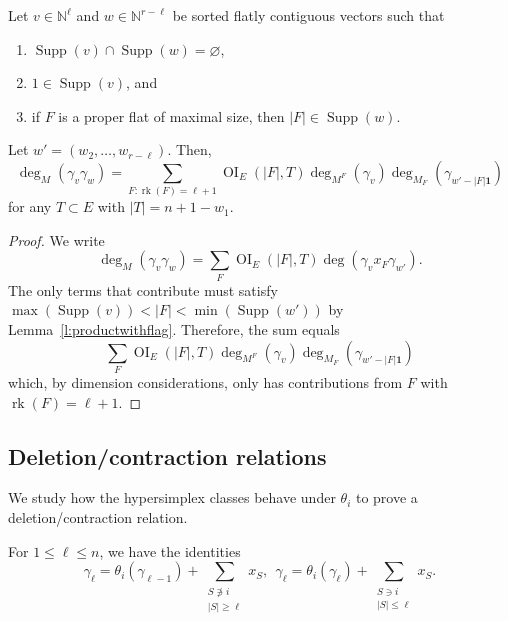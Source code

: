 \documentclass[ALCO,published]{cedram}
\numberwithin{equation}{section}
\numberwithin{figure}{section}
\newcommand{\N}{\mathbb{N}}
\DeclareMathOperator{\OI}{OI}
\DeclareMathOperator{\Supp}{Supp}
\DeclareMathOperator{\rk}{rk}
\begin{document}
\begin{lemma} \label{l:contiguousblocks}
    Let $v\in \N^{\ell}$ and $w\in \N^{r-{\ell}}$ be sorted flatly contiguous vectors such that 
    \begin{enumerate}
        \item $\Supp(v)\cap\Supp(w)= \varnothing$,
        \item $1 \in\Supp(v)$, and
        \item if $F$ is a proper flat of maximal size, then $|F|\in \Supp(w)$.
    \end{enumerate}
    Let $w'=(w_2,\dots,w_{r-\ell})$.
    Then,
    \[\deg_M(\gamma_v\gamma_w)=\sum_{F:\operatorname{rk}(F)=\ell+1} \OI_{E}(|F|,T)\deg_{M^F}(\gamma_v)\deg_{M_F}(\gamma_{w'-|F|\mathbf{1}})
    \]
    for any $T\subset E$ with $|T|=n+1-w_1.$
\end{lemma}

\begin{proof}
    We write
    \[\deg_M(\gamma_v\gamma_w)=\sum_F \OI_{E}(|F|,T)\deg(\gamma_v x_F\gamma_{w'}).\]
    The only terms that contribute must satisfy $\max(\Supp(v))<|F|<\min(\Supp(w'))$
    by Lemma~\ref{l:productwithflag}. Therefore, the sum equals
    \[\sum_F \OI_{E}(|F|,T)\deg_{M^F}(\gamma_v)\deg_{M_F}(\gamma_{w'-|F|\mathbf{1}})\]
    which, by dimension considerations, only has contributions from $F$ with $\rk(F)=\ell+1$.
\end{proof}

\subsection{Deletion/contraction relations}

We study how the hypersimplex classes behave under $\theta_i$ to prove a deletion/contraction relation.
\begin{lemma} \label{l:twists}
    For $1\leq \ell\leq n$, we have the identities
    \[  \gamma_\ell=\theta_i(\gamma_{\ell-1})+\sum_{\substack{S\not\ni i\\|S|\geq \ell}} x_S,\ \ 
        \gamma_\ell=\theta_i(\gamma_\ell)+\sum_{\substack{S\ni i\\|S|\leq \ell}} x_S.\]
\end{lemma}
\end{document}
